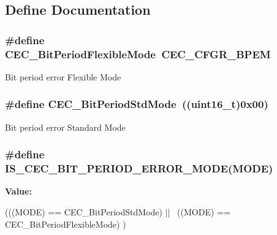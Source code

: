 \subsection{Define Documentation}
\hypertarget{group__CEC__BitPeriod__Mode_ga5bf4c1b257b837770d4d59c93cca6902}{
\subsubsection[{CEC\_\-BitPeriodFlexibleMode}]{\setlength{\rightskip}{0pt plus 5cm}\#define CEC\_\-BitPeriodFlexibleMode~CEC\_\-CFGR\_\-BPEM}}
\label{group__CEC__BitPeriod__Mode_ga5bf4c1b257b837770d4d59c93cca6902}
Bit period error Flexible Mode \hypertarget{group__CEC__BitPeriod__Mode_ga746ce0a831dfd76a47add310662c7f07}{
\subsubsection[{CEC\_\-BitPeriodStdMode}]{\setlength{\rightskip}{0pt plus 5cm}\#define CEC\_\-BitPeriodStdMode~((uint16\_\-t)0x00)}}
\label{group__CEC__BitPeriod__Mode_ga746ce0a831dfd76a47add310662c7f07}
Bit period error Standard Mode \hypertarget{group__CEC__BitPeriod__Mode_ga3414347854a83bf70748624ec5b8dd49}{
\subsubsection[{IS\_\-CEC\_\-BIT\_\-PERIOD\_\-ERROR\_\-MODE}]{\setlength{\rightskip}{0pt plus 5cm}\#define IS\_\-CEC\_\-BIT\_\-PERIOD\_\-ERROR\_\-MODE(MODE)}}
\label{group__CEC__BitPeriod__Mode_ga3414347854a83bf70748624ec5b8dd49}
{\bfseries Value:}
\begin{DoxyCode}
(((MODE) == CEC_BitPeriodStdMode) || \
                                            ((MODE) == CEC_BitPeriodFlexibleMode)
      )
\end{DoxyCode}
